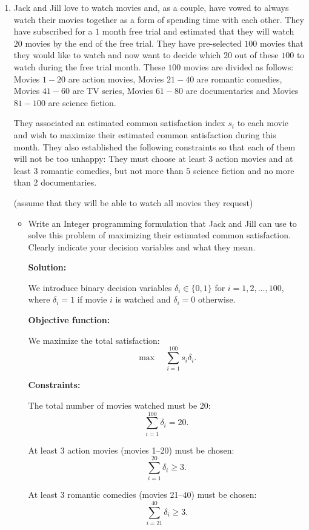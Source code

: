 \documentclass{article}
\begin{document}
\begin{enumerate}
Finally, we require that at least one condition is satisfied:
\[
r_0 + r_1 \geq 1.
\]

\item Jack and Jill love to watch movies and, as a couple, have vowed to always watch their movies together as a form of spending time with each other. They have subscribed for a $1$ month free trial and estimated that they will watch $20$ movies by the end of the free trial. They have pre-selected $100$ movies that they would like to watch and now want to decide which $20$ out of these $100$ to watch during the free trial month. These $100$ movies are divided as follows: Movies $1-20$ are action movies, Movies $21-40$ are romantic comedies, Movies $41-60$ are TV series, Movies $61-80$ are documentaries and Movies $81-100$ are science fiction.

They associated an estimated common satisfaction index $s_i$ to each movie and wish to maximize their estimated common satisfaction during this month. They also established the following constraints so that  each of them will not be too unhappy: They must choose at least $3$ action movies and at least $3$ romantic comedies, but not more than $5$ science fiction and no more than $2$ documentaries.

(assume that they will be able to watch all movies they request)

\begin{itemize}
\item[a)] Write an Integer programming formulation that Jack and Jill can use to solve this problem of maximizing their estimated common satisfaction. Clearly indicate your decision variables and what they mean.

\textbf{Solution:}

We introduce binary decision variables $\delta_i \in \{0,1\}$ for $i = 1, 2, \ldots, 100$, where $\delta_i = 1$ if movie $i$ is watched and $\delta_i = 0$ otherwise.

\textbf{Objective function:}

We maximize the total satisfaction:
\[
\max \quad \sum_{i=1}^{100} s_i \delta_i.
\]

\textbf{Constraints:}

The total number of movies watched must be 20:
\[
\sum_{i=1}^{100} \delta_i = 20.
\]

At least 3 action movies (movies 1--20) must be chosen:
\[
\sum_{i=1}^{20} \delta_i \geq 3.
\]

At least 3 romantic comedies (movies 21--40) must be chosen:
\[
\sum_{i=21}^{40} \delta_i \geq 3.
\]


\end{itemize}
\end{enumerate}
\end{document}
